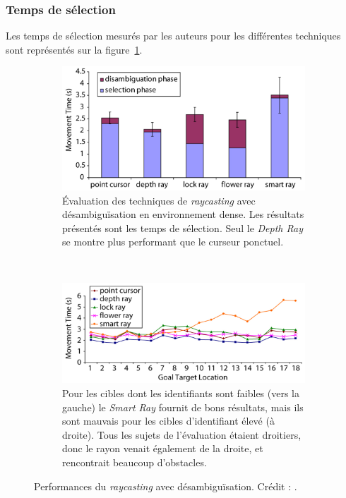 	\subsubsection{Temps de sélection}
	
	Les temps de sélection mesurés par les auteurs pour les différentes techniques sont représentés sur la figure~\ref{fig:rayTimes}.
	
	\begin{figure}[!htb]
		\begin{subfigure}[t]{0.49\textwidth}
			\centering
			\includegraphics[width=\textwidth]{figures/ch2/rayTimes}
			\caption{Évaluation des techniques de \emph{raycasting} avec désambiguïsation en environnement dense. Les résultats présentés sont les temps de sélection. Seul le \emph{Depth Ray} se montre plus performant que le curseur ponctuel.}
			\label{fig:rayTimes}
		\end{subfigure}
		~
		\begin{subfigure}[t]{0.49\textwidth}
			\centering
			\includegraphics[width=\textwidth]{figures/ch2/smartRayLocation}
			\caption{Pour les cibles dont les identifiants sont faibles (vers la gauche) le \emph{Smart Ray} fournit de bons résultats, mais ils sont mauvais pour les cibles d'identifiant élevé (à droite). Tous les sujets de l'évaluation étaient droitiers, donc le rayon venait également de la droite, et rencontrait beaucoup d'obstacles.}
			\label{fig:smartRayLocation}
		\end{subfigure}
		\caption[Performances du \emph{raycasting} avec désambiguïsation]{Performances du \emph{raycasting} avec désambiguïsation. Crédit : \cite{grossman2006design}.}
		\label{fig:rayPerf}
	\end{figure}

